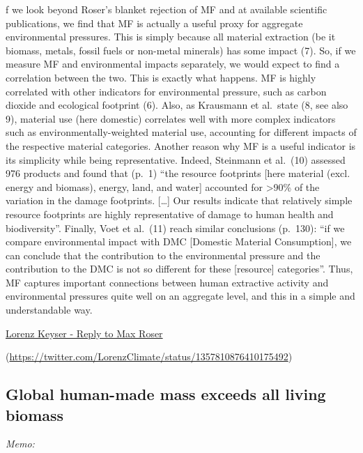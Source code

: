 \documentclass[
]{book}
\begin{document}
f we look beyond Roser's blanket rejection of MF and at available scientific publications, we find that MF is actually a useful proxy for aggregate environmental pressures. This is simply because all material extraction (be it biomass, metals, fossil fuels or non-metal minerals) has some impact (7). So, if we measure MF and environmental impacts separately, we would expect to find a correlation between the two. This is exactly what happens. MF is highly correlated with other indicators for environmental pressure, such as carbon dioxide and ecological footprint (6). Also, as Krausmann et al.~state (8, see also 9), material use (here domestic) correlates well with more complex indicators such as environmentally-weighted material use, accounting for different impacts of the respective material categories. Another reason why MF is a useful indicator is its simplicity while being representative.
Indeed, Steinmann et al.~(10) assessed 976 products and found that (p.~1) ``the resource footprints {[}here material (excl. energy and biomass), energy, land, and water{]} accounted for \textgreater90\% of the variation in the damage footprints. {[}\ldots{]} Our results indicate that relatively simple resource footprints are highly representative of damage to human health and biodiversity''. Finally, Voet et al.~(11) reach similar conclusions (p.~130): ``if we compare environmental impact with DMC {[}Domestic Material Consumption{]}, we can conclude that the contribution to the environmental pressure and the contribution to the DMC is not so different for these {[}resource{]} categories''. Thus, MF captures important connections between human extractive activity and environmental pressures quite well on an aggregate level, and this in a simple and understandable way.

\href{https://degrowth.org/2021/02/06/aggregate-material-footprint-as-a-proxy-for-environmental-pressures/}{Lorenz Keyser - Reply to Max Roser}

\citep[ Twitter Thread]{LorenzClimate}(\url{https://twitter.com/LorenzClimate/status/1357810876410175492})

\hypertarget{global-human-made-mass-exceeds-all-living-biomass}{%
\subsection{Global human-made mass exceeds all living biomass}\label{global-human-made-mass-exceeds-all-living-biomass}}

\emph{Memo:}
\end{document}
